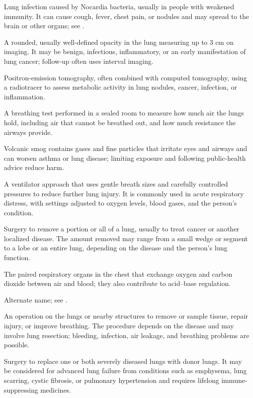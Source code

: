  Lung infection caused by Nocardia bacteria, usually in people with weakened immunity. It can cause cough, fever, chest pain, or nodules and may spread to the brain or other organs; see .

 A rounded, usually well-defined opacity in the lung measuring up to 3 cm on imaging. It may be benign, infectious, inflammatory, or an early manifestation of lung cancer; follow-up often uses interval imaging.

 Positron-emission tomography, often combined with computed tomography, using a radiotracer to assess metabolic activity in lung nodules, cancer, infection, or inflammation.

 A breathing test performed in a sealed room to measure how much air the lungs hold, including air that cannot be breathed out, and how much resistance the airways provide.

 Volcanic smog contains gases and fine particles that irritate eyes and airways and can worsen asthma or lung disease; limiting exposure and following public-health advice reduce harm.

 A ventilator approach that uses gentle breath sizes and carefully controlled pressures to reduce further lung injury. It is commonly used in acute respiratory distress, with settings adjusted to oxygen levels, blood gases, and the person’s condition.

 Surgery to remove a portion or all of a lung, usually to treat cancer or another localized disease. The amount removed may range from a small wedge or segment to a lobe or an entire lung, depending on the disease and the person's lung function.

 The paired respiratory organs in the chest that exchange oxygen and carbon dioxide between air and blood; they also contribute to acid--base regulation.

 Alternate name; see .

 An operation on the lungs or nearby structures to remove or sample tissue, repair injury, or improve breathing. The procedure depends on the disease and may involve lung resection; bleeding, infection, air leakage, and breathing problems are possible.

 Surgery to replace one or both severely diseased lungs with donor lungs. It may be considered for advanced lung failure from conditions such as emphysema, lung scarring, cystic fibrosis, or pulmonary hypertension and requires lifelong immune-suppressing medicines.

